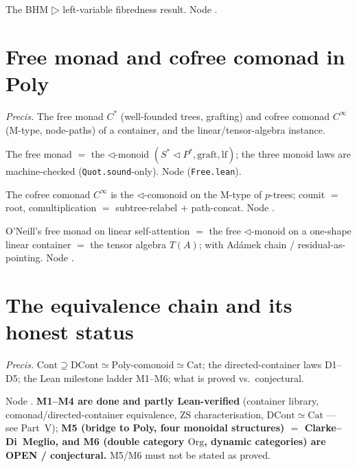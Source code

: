 \documentclass[11pt]{article}
\begin{document}
\begin{proposition}
The BHM $▷$ left-variable fibredness result. Node .
\end{proposition}

\section{Free monad and cofree comonad in Poly}
\emph{Precis.} The free monad $C^{*}$ (well-founded trees, grafting) and cofree comonad $C^{∞}$
(M-type, node-paths) of a container, and the linear/tensor-algebra instance.

\begin{theorem}
The free monad $=$ the $\triangleleft$-monoid $(S^{*}\triangleleft P^{*},\mathrm{graft},\mathrm{lf})$;
the three monoid laws are machine-checked (\texttt{Quot.sound}-only). Node
 (\texttt{Free.lean}).
\end{theorem}

\begin{theorem}
The cofree comonad $C^{∞}$ is the $\triangleleft$-comonoid on the M-type of $p$-trees; counit $=$
root, comultiplication $=$ subtree-relabel $+$ path-concat. Node .
\end{theorem}

\begin{theorem}
O'Neill's free monad on linear self-attention $=$ the free $\triangleleft$-monoid on a one-shape
linear container $=$ the tensor algebra $T(A)$; with Ad\'amek chain / residual-as-pointing. Node
.
\end{theorem}

\section{The equivalence chain and its honest status}
\emph{Precis.} $\mathrm{Cont}\supseteq\mathrm{DCont}\simeq\text{Poly-comonoid}\simeq\mathrm{Cat}$;
the directed-container laws D1--D5; the Lean milestone ladder M1--M6; what is proved vs.\ conjectural.

\begin{theorem}
Node . \textbf{M1--M4 are done and partly Lean-verified} (container library,
comonad/directed-container equivalence, ZS characterisation, $\mathrm{DCont}\simeq\mathrm{Cat}$ ---
see Part~V); \textbf{M5 (bridge to Poly, four monoidal structures) $=$ Clarke--Di~Meglio, and M6
(double category $\mathrm{Org}$, dynamic categories) are OPEN / conjectural.} M5/M6 must not be
stated as proved.
\end{theorem}
\end{document}
